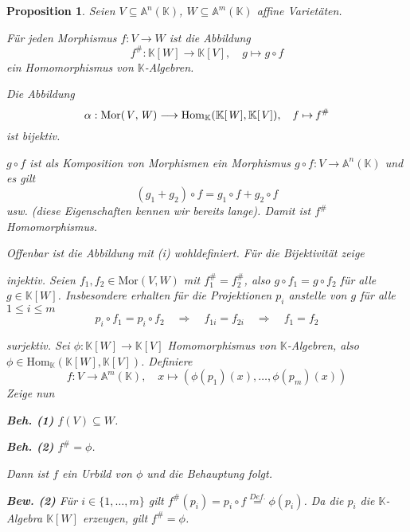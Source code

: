 \documentclass[11pt]{book}
\newtheorem{prop}[theorem]{Proposition}
\theoremstyle{nonumberbreak}
\newenvironment{pr}[1][]{\ifthenelse{\equal{#1}{}}{\proof}{\proof[#1]}\rm}{\endproof}
\begin{document}
\begin{spacing}{1.3}
\begin{prop} %
Seien $V \subseteq \mathbb{A}^n(\mathbb{K})$, $W \subseteq \mathbb{A}^m(\mathbb{K})$ affine Varietäten.
\begin{compactenum}
\item Für jeden Morphismus $f:V \longrightarrow W$ ist die Abbildung
$$f^\#: \mathbb{K}[W] \longrightarrow \mathbb{K}[V], \quad g \mapsto g \circ f$$
ein Homomorphismus von $\mathbb{K}$-Algebren.
\item Die Abbildung
$$\alpha: \rm{Mor}\it(V,W) \longrightarrow \rm{Hom}\it_{\mathbb{K}}(\mathbb{K}[W], \mathbb{K}[V]), \quad f \mapsto f^\#$$
ist bijektiv.
\end{compactenum}
\begin{pr}
\begin{compactenum}
\item $g \circ f$ ist als Komposition von Morphismen ein Morphismus $g\circ f: V \longrightarrow \mathbb{A}^n(\mathbb{K})$ und es gilt
$$(g_1+g_2)\circ f = g_1 \circ f  + g_2 \circ f $$
usw. (diese Eigenschaften kennen wir bereits lange). Damit ist $f^\#$ Homomorphismus.
\item Offenbar ist die Abbildung mit (i) wohldefiniert. Für die Bijektivität zeige
\begin{compactenum}
\item[\textit{injektiv.}] Seien $f_1, f_2 \in \textrm{Mor}(V,W)$ mit $f_1^\#=f_2^\#$, also $g\circ f_1= g \circ f_2$ für alle $g \in \mathbb{K}[W]$. Insbesondere erhalten für die Projektionen $p_i$ anstelle von $g$ für alle $1 \leqslant i \leqslant m$
$$p_i \circ f_1 = p_i \circ f_2 \quad \Longrightarrow \quad f_{1i}=f_{2i} \quad \Longrightarrow \quad f_1=f_2$$
\item[\textit{surjektiv.}] Sei $\phi: \mathbb{K}[W] \longrightarrow \mathbb{K}[V]$ Homomorphismus von $\mathbb{K}$-Algebren, also $\phi \in \textrm{Hom}_{\mathbb{K}}(\mathbb{K}[W], \mathbb{K}[V])$. Definiere
$$f: V \longrightarrow \mathbb{A}^m(\mathbb{K}), \quad x \mapsto \left(\phi(p_1)(x), \ldots, \phi(p_m)(x) \right)$$
Zeige nun
\begin{compactenum}
\item[\textbf{Beh. (1)}] $f(V) \subseteq W$.
\item[\textbf{Beh. (2)}] $f^\# = \phi$.
\end{compactenum}
Dann ist $f$ ein Urbild von $\phi$ und die Behauptung folgt.
\begin{compactenum}
\item[\textbf{Bew. (2)}] Für $i \in \{1, \ldots, m \}$ gilt $f^\#(p_i)=p_i \circ f \overset{Def.}{=} \phi(p_i)$. Da die $p_i$ die $\mathbb{K}$-Algebra $\mathbb{K}[W]$ erzeugen, gilt $f^\#=\phi$.

\end{compactenum}
\end{compactenum}
\end{compactenum}
\end{pr}
\end{prop}
\end{spacing}
\end{document}
